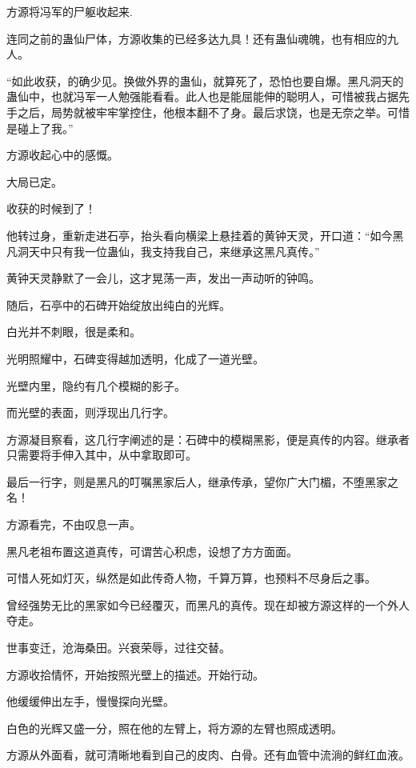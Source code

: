 
\begin{this_body}

方源将冯军的尸躯收起来.

连同之前的蛊仙尸体，方源收集的已经多达九具！还有蛊仙魂魄，也有相应的九人。

“如此收获，的确少见。换做外界的蛊仙，就算死了，恐怕也要自爆。黑凡洞天的蛊仙中，也就冯军一人勉强能看看。此人也是能屈能伸的聪明人，可惜被我占据先手之后，局势就被牢牢掌控住，他根本翻不了身。最后求饶，也是无奈之举。可惜是碰上了我。”

方源收起心中的感慨。

大局已定。

收获的时候到了！

他转过身，重新走进石亭，抬头看向横梁上悬挂着的黄钟天灵，开口道：“如今黑凡洞天中只有我一位蛊仙，我支持我自己，来继承这黑凡真传。”

黄钟天灵静默了一会儿，这才晃荡一声，发出一声动听的钟鸣。

随后，石亭中的石碑开始绽放出纯白的光辉。

白光并不刺眼，很是柔和。

光明照耀中，石碑变得越加透明，化成了一道光壁。

光壁内里，隐约有几个模糊的影子。

而光壁的表面，则浮现出几行字。

方源凝目察看，这几行字阐述的是：石碑中的模糊黑影，便是真传的内容。继承者只需要将手伸入其中，从中拿取即可。

最后一行字，则是黑凡的叮嘱黑家后人，继承传承，望你广大门楣，不堕黑家之名！

方源看完，不由叹息一声。

黑凡老祖布置这道真传，可谓苦心积虑，设想了方方面面。

可惜人死如灯灭，纵然是如此传奇人物，千算万算，也预料不尽身后之事。

曾经强势无比的黑家如今已经覆灭，而黑凡的真传。现在却被方源这样的一个外人夺走。

世事变迁，沧海桑田。兴衰荣辱，过往交替。

方源收拾情怀，开始按照光壁上的描述。开始行动。

他缓缓伸出左手，慢慢探向光壁。

白色的光辉又盛一分，照在他的左臂上，将方源的左臂也照成透明。

方源从外面看，就可清晰地看到自己的皮肉、白骨。还有血管中流淌的鲜红血液。


\end{this_body}
